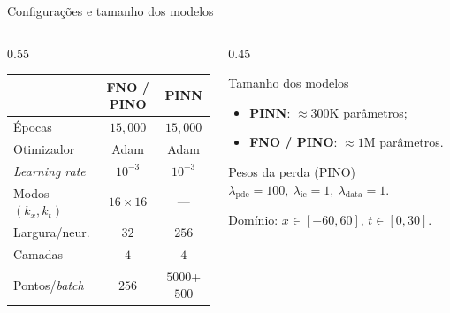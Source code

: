 \begin{frame}{Configurações e tamanho dos modelos}
  \begin{columns}[c,totalwidth=\textwidth]
    \begin{column}{0.55\textwidth}
      \footnotesize
      \setlength{\tabcolsep}{4pt}
      \centering
      \begin{tabular}{@{}lcc@{}}
        \toprule
        & \textbf{FNO / PINO} & \textbf{PINN} \\
        \midrule
        Épocas              & $15{,}000$    & $15{,}000$ \\
        Otimizador          & Adam          & Adam \\
        \emph{Learning rate}& $10^{-3}$     & $10^{-3}$ \\
        Modos $(k_x,k_t)$   & $16\times 16$ & --- \\
        Largura/neur.       & $32$          & $256$ \\
        Camadas             & $4$           & $4$ \\
        Pontos/\emph{batch} & $256$         & $5000$+$500$ \\
        \bottomrule
      \end{tabular}
    \end{column}
    \begin{column}{0.45\textwidth}
      \begin{block}{Tamanho dos modelos}
        \footnotesize
        \begin{itemize}
          \item \textbf{PINN}: $\approx 300$K parâmetros;
          \item \textbf{FNO / PINO}: $\approx 1$M parâmetros.
        \end{itemize}
      \end{block}
      \begin{block}{Pesos da perda (PINO)}
        \footnotesize
        $\lambda_{\text{pde}}=100,\ \lambda_{\text{ic}}=1,\ \lambda_{\text{data}}=1$.
      \end{block}
      {\footnotesize Domínio: $x\in[-60,60]$, $t\in[0,30]$.}
    \end{column}
  \end{columns}
\end{frame}
